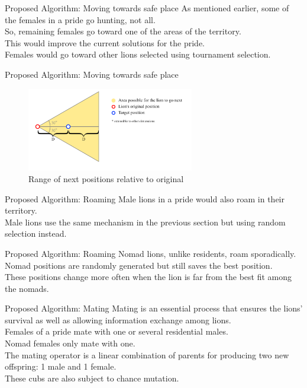 \documentclass[xcolor=table]{beamer}
\begin{document}
\begin{frame}{Proposed Algorithm: Moving towards safe place}
As mentioned earlier, some of the females in a pride go hunting, not all.\\So, remaining females go toward one of the areas of the territory.\\This would improve the current solutions for the pride.\\Females would go toward other lions selected using tournament selection.
\end{frame}

\begin{frame}{Proposed Algorithm: Moving towards safe place}
  \begin{figure}[h]
  \begin{center}
  \includegraphics[width=0.65\textwidth]{img/moving/moving}
  \caption{Range of next positions relative to original}
  \end{center}
  \end{figure}
\end{frame}

\begin{frame}{Proposed Algorithm: Roaming}
Male lions in a pride would also roam in their territory.\\Male lions use the same mechanism in the previous section but using random selection instead.
\end{frame}

\begin{frame}{Proposed Algorithm: Roaming}
Nomad lions, unlike residents, roam sporadically.\\Nomad positions are randomly generated but still saves the best position.\\These positions change more often when the lion is far from the best fit among the nomads.
\end{frame}

\begin{frame}{Proposed Algorithm: Mating}
Mating is an essential process that ensures the lions' survival as well as allowing information exchange among lions. \\Females of a pride mate with one or several residential males. \\Nomad females only mate with one. \\The mating operator is a linear combination of parents for producing two new offspring: 1 male and 1 female. \\These cubs are also subject to chance mutation.
\end{frame}
\end{document}
